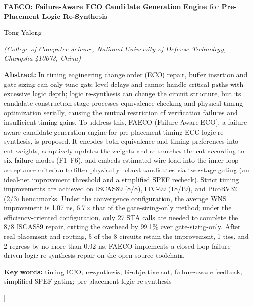 \documentclass[twocolumn,10pt]{ctexart}
\begin{document}
\vspace{6pt}
\begin{center}
{\bfseries\fontsize{13.5}{18}\selectfont FAECO: Failure-Aware ECO Candidate Generation Engine for Pre-Placement Logic Re-Synthesis}\par
\vspace{5pt}
{\normalsize Tong Yalong\par}
\vspace{3pt}
{\small \itshape (College of Computer Science, National University of Defense Technology, Changsha 410073, China)}\par
\vspace{6pt}
\end{center}
\begin{flushleft}
{\bfseries Abstract:} {\small In timing engineering change order (ECO) repair, buffer insertion and gate sizing can only tune gate-level delays and cannot handle critical paths with excessive logic depth; logic re-synthesis can change the circuit structure, but its candidate construction stage processes equivalence checking and physical timing optimization serially, causing the mutual restriction of verification failures and insufficient timing gains. To address this, FAECO (Failure-Aware ECO), a failure-aware candidate generation engine for pre-placement timing-ECO logic re-synthesis, is proposed. It encodes both equivalence and timing preferences into cut weights, adaptively updates the weights and re-searches the cut according to six failure modes (F1--F6), and embeds estimated wire load into the inner-loop acceptance criterion to filter physically robust candidates via two-stage gating (an ideal-net improvement threshold and a simplified SPEF recheck). Strict timing improvements are achieved on ISCAS89 (8/8), ITC-99 (18/19), and PicoRV32 (2/3) benchmarks. Under the convergence configuration, the average WNS improvement is 1.07 ns, 6.7$\times$ that of the gate-sizing-only method; under the efficiency-oriented configuration, only 27 STA calls are needed to complete the 8/8 ISCAS89 repair, cutting the overhead by 99.1\% over gate-sizing-only. After real placement and routing, 5 of the 8 circuits retain the improvement, 1 ties, and 2 regress by no more than 0.02 ns. FAECO implements a closed-loop failure-driven logic re-synthesis repair on the open-source toolchain.}\par
\vspace{3pt}
{\bfseries Key words:} {\small timing ECO; re-synthesis; bi-objective cut; failure-aware feedback; simplified SPEF gating; pre-placement logic re-synthesis}\par
\end{flushleft}
]%
\end{document}
